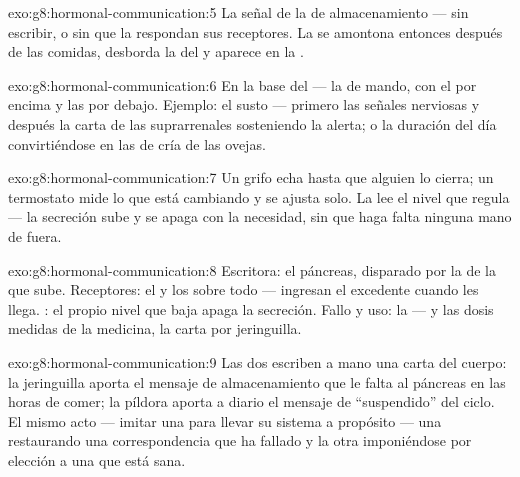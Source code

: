 \begin{solution}{exo:g8:hormonal-communication:5}
La señal de la  de almacenamiento --- sin escribir, o sin que la
respondan sus receptores. La  se amontona entonces después de
las comidas, desborda la  del  y aparece en la .
\end{solution}

\begin{solution}{exo:g8:hormonal-communication:6}
En la base del  --- la  de mando, con el  por encima y las  por debajo. Ejemplo: el susto ---
primero las señales nerviosas y después la carta de las suprarrenales
sosteniendo la alerta; o la duración del día convirtiéndose en las
 de cría de las ovejas.
\end{solution}

\begin{solution}{exo:g8:hormonal-communication:7}
Un grifo echa hasta que alguien lo cierra; un termostato mide lo que
está cambiando y se ajusta solo. La  lee el nivel que regula
--- la secreción sube y se apaga con la necesidad, sin que haga falta
ninguna mano de fuera.
\end{solution}

\begin{solution}{exo:g8:hormonal-communication:8}
Escritora: el páncreas, disparado por la  de la  que sube.
Receptores: el  y los  sobre todo --- ingresan el
excedente cuando les llega. : el propio nivel que baja
apaga la secreción. Fallo y uso: la  --- y las dosis medidas de
la medicina, la carta por jeringuilla.
\end{solution}

\begin{solution}{exo:g8:hormonal-communication:9}
Las dos escriben a mano una carta del cuerpo: la jeringuilla aporta el
mensaje de almacenamiento que le falta al páncreas en las horas de
comer; la píldora aporta a diario el mensaje de ``suspendido'' del
ciclo. El mismo acto --- imitar una  para llevar su sistema a
propósito --- una restaurando una correspondencia que ha fallado y la
otra imponiéndose por elección a una que está sana.
\end{solution}

